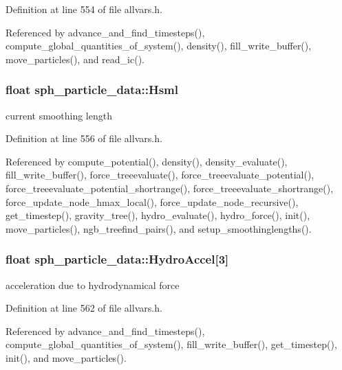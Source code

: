 Definition at line 554 of file allvars.h.



Referenced by advance\_\-and\_\-find\_\-timesteps(), compute\_\-global\_\-quantities\_\-of\_\-system(), density(), fill\_\-write\_\-buffer(), move\_\-particles(), and read\_\-ic().

\hypertarget{structsph__particle__data_af9efa599cdd656b26a0df5f89430b4d1}{
\subsubsection[{Hsml}]{\setlength{\rightskip}{0pt plus 5cm}float {\bf sph\_\-particle\_\-data::Hsml}}}
\label{structsph__particle__data_af9efa599cdd656b26a0df5f89430b4d1}
current smoothing length 

Definition at line 556 of file allvars.h.



Referenced by compute\_\-potential(), density(), density\_\-evaluate(), fill\_\-write\_\-buffer(), force\_\-treeevaluate(), force\_\-treeevaluate\_\-potential(), force\_\-treeevaluate\_\-potential\_\-shortrange(), force\_\-treeevaluate\_\-shortrange(), force\_\-update\_\-node\_\-hmax\_\-local(), force\_\-update\_\-node\_\-recursive(), get\_\-timestep(), gravity\_\-tree(), hydro\_\-evaluate(), hydro\_\-force(), init(), move\_\-particles(), ngb\_\-treefind\_\-pairs(), and setup\_\-smoothinglengths().

\hypertarget{structsph__particle__data_aa3441b1ee8351048b3dcac10b36b0b6c}{
\subsubsection[{HydroAccel}]{\setlength{\rightskip}{0pt plus 5cm}float {\bf sph\_\-particle\_\-data::HydroAccel}\mbox{[}3\mbox{]}}}
\label{structsph__particle__data_aa3441b1ee8351048b3dcac10b36b0b6c}
acceleration due to hydrodynamical force 

Definition at line 562 of file allvars.h.



Referenced by advance\_\-and\_\-find\_\-timesteps(), compute\_\-global\_\-quantities\_\-of\_\-system(), fill\_\-write\_\-buffer(), get\_\-timestep(), init(), and move\_\-particles().

